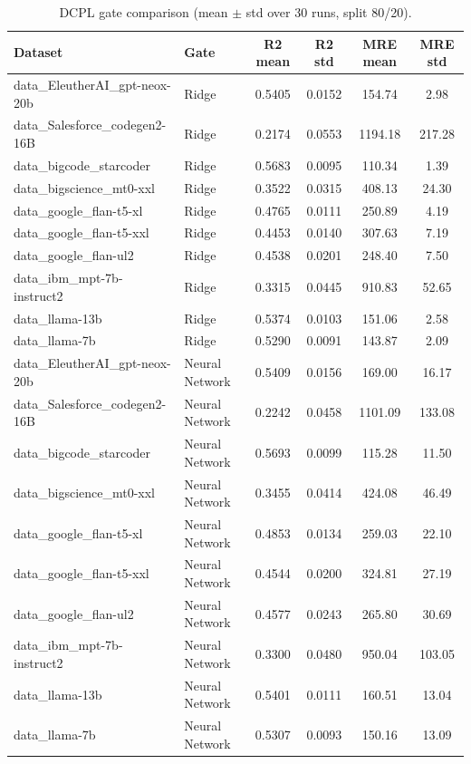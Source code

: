 
\begin{table}[t]
\centering
\caption{DCPL gate comparison (mean $\pm$ std over 30 runs, split 80/20).}
\label{tab:dcpl_gate_comparison}
\small
\begin{tabular}{l l c c c c}
\toprule
Dataset & Gate & R2 mean & R2 std & MRE mean & MRE std \\
\midrule
data\_EleutherAI\_gpt-neox-20b & Ridge & 0.5405 & 0.0152 & 154.74 & 2.98 \\
data\_Salesforce\_codegen2-16B & Ridge & 0.2174 & 0.0553 & 1194.18 & 217.28 \\
data\_bigcode\_starcoder & Ridge & 0.5683 & 0.0095 & 110.34 & 1.39 \\
data\_bigscience\_mt0-xxl & Ridge & 0.3522 & 0.0315 & 408.13 & 24.30 \\
data\_google\_flan-t5-xl & Ridge & 0.4765 & 0.0111 & 250.89 & 4.19 \\
data\_google\_flan-t5-xxl & Ridge & 0.4453 & 0.0140 & 307.63 & 7.19 \\
data\_google\_flan-ul2 & Ridge & 0.4538 & 0.0201 & 248.40 & 7.50 \\
data\_ibm\_mpt-7b-instruct2 & Ridge & 0.3315 & 0.0445 & 910.83 & 52.65 \\
data\_llama-13b & Ridge & 0.5374 & 0.0103 & 151.06 & 2.58 \\
data\_llama-7b & Ridge & 0.5290 & 0.0091 & 143.87 & 2.09 \\
data\_EleutherAI\_gpt-neox-20b & Neural Network & 0.5409 & 0.0156 & 169.00 & 16.17 \\
data\_Salesforce\_codegen2-16B & Neural Network & 0.2242 & 0.0458 & 1101.09 & 133.08 \\
data\_bigcode\_starcoder & Neural Network & 0.5693 & 0.0099 & 115.28 & 11.50 \\
data\_bigscience\_mt0-xxl & Neural Network & 0.3455 & 0.0414 & 424.08 & 46.49 \\
data\_google\_flan-t5-xl & Neural Network & 0.4853 & 0.0134 & 259.03 & 22.10 \\
data\_google\_flan-t5-xxl & Neural Network & 0.4544 & 0.0200 & 324.81 & 27.19 \\
data\_google\_flan-ul2 & Neural Network & 0.4577 & 0.0243 & 265.80 & 30.69 \\
data\_ibm\_mpt-7b-instruct2 & Neural Network & 0.3300 & 0.0480 & 950.04 & 103.05 \\
data\_llama-13b & Neural Network & 0.5401 & 0.0111 & 160.51 & 13.04 \\
data\_llama-7b & Neural Network & 0.5307 & 0.0093 & 150.16 & 13.09 \\
\bottomrule
\end{tabular}
\end{table}
